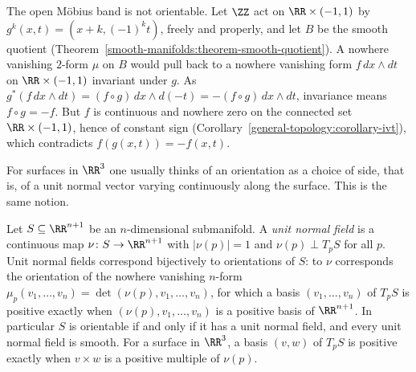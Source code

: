 \begin{counterexample}\label{differential-forms:counterexample-mobius}
The open M\"obius band is not orientable. Let $\ZZ$ act on $\RR \times (-1, 1)$ by $g^k(x, t) = (x + k, (-1)^kt)$, freely and properly, and let $B$ be the smooth quotient (Theorem~\ref{smooth-manifolds:theorem-smooth-quotient}). A
nowhere vanishing $2$-form $\mu$ on $B$ would pull back to a nowhere vanishing form $f\,dx \wedge dt$ on $\RR \times (-1, 1)$ invariant under $g$. As $g^*(f\,dx \wedge dt) = (f \circ g)\,dx \wedge d(-t) = -(f \circ g)\,dx \wedge dt$,
invariance means $f \circ g = -f$. But $f$ is continuous and nowhere zero on the connected set $\RR \times (-1, 1)$, hence of constant sign (Corollary~\ref{general-topology:corollary-ivt}), which contradicts $f(g(x, t)) = -f(x, t)$.
\end{counterexample}

For surfaces in $\RR^3$ one usually thinks of an orientation as a choice of side, that is, of a unit normal vector varying continuously along the surface. This is
the same notion.

\begin{proposition}\label{differential-forms:proposition-orientation-normal}
Let $S \subseteq \RR^{n+1}$ be an $n$-dimensional submanifold. A \emph{unit normal field} is a continuous map $\nu \colon S \to \RR^{n+1}$ with $|\nu(p)| = 1$ and
$\nu(p) \perp T_pS$ for all $p$. Unit normal fields correspond bijectively to orientations of $S$: to $\nu$ corresponds the orientation of the nowhere vanishing
$n$-form $\mu_p(v_1, \ldots, v_n) = \det(\nu(p), v_1, \ldots, v_n)$, for which a basis $(v_1, \ldots, v_n)$ of $T_pS$ is positive exactly when $(\nu(p), v_1, \ldots, v_n)$ is a
positive basis of $\RR^{n+1}$. In particular $S$ is orientable if and only if it has a unit normal field, and every unit normal field is smooth. For a surface in $\RR^3$, a
basis $(v, w)$ of $T_pS$ is positive exactly when $v \times w$ is a positive multiple of $\nu(p)$.
\end{proposition}

